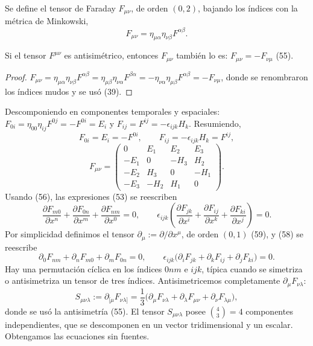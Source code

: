 \begin{definicion}
Se define el tensor de Faraday $F_{\mu\nu}$, de orden $(0,2)$, bajando
los índices con la métrica de Minkowski,
\[
F_{\mu\nu} = \eta_{\mu\alpha}\eta_{\nu\beta}F^{\alpha\beta}. \tag{54}
\]
\end{definicion}

\begin{proposicionc}
Si el tensor $F^{\mu\nu}$ es antisimétrico, entonces $F_{\mu\nu}$
también lo es: $F_{\mu\nu}=-F_{\nu\mu}$ (55).
\end{proposicionc}

\begin{proof}
$F_{\mu\nu}=\eta_{\mu\alpha}\eta_{\nu\beta}F^{\alpha\beta}=\eta_{\mu\beta}
\eta_{\nu\alpha}F^{\beta\alpha}=-\eta_{\nu\alpha}\eta_{\mu\beta}
F^{\alpha\beta}=-F_{\nu\mu}$, donde se renombraron los índices mudos y se
usó (39). \qedhere
\end{proof}

Descomponiendo en componentes temporales y espaciales:
$F_{0i}=\eta_{00}\eta_{ij}F^{0j}=-F^{0i}=E_i$ y
$F_{ij}=F^{ij}=-\epsilon_{ijk}H_k$. Resumiendo,
\[
F_{0i}=E_i=-F^{0i}, \qquad F_{ij}=-\epsilon_{ijk}H_k=F^{ij}, \tag{56}
\]
\[
F_{\mu\nu}=\begin{pmatrix}0&E_1&E_2&E_3\\-E_1&0&-H_3&H_2\\-E_2&H_3&0&-H_1
\\-E_3&-H_2&H_1&0\end{pmatrix}. \tag{57}
\]
Usando (56), las expresiones (53) se reescriben
\[
\frac{\partial F_{m0}}{\partial x^n}+\frac{\partial F_{0n}}{\partial
x^m}+\frac{\partial F_{nm}}{\partial x^0}=0, \qquad
\epsilon_{ijk}\left(\frac{\partial F_{jk}}{\partial x^i}+\frac{\partial
F_{ij}}{\partial x^k}+\frac{\partial F_{ki}}{\partial x^j}\right)=0.
\tag{58}
\]
Por simplicidad definimos el tensor $\partial_\mu:=\partial/\partial
x^\mu$, de orden $(0,1)$ (59), y (58) se reescribe
\[
\partial_0F_{nm}+\partial_nF_{m0}+\partial_mF_{0n}=0, \qquad
\epsilon_{ijk}\big(\partial_iF_{jk}+\partial_kF_{ij}+\partial_jF_{ki}
\big)=0. \tag{60}
\]
Hay una permutación cíclica en los índices $0nm$ e $ijk$, típica cuando
se simetriza o antisimetriza un tensor de tres índices. Antisimetricemos
completamente $\partial_\mu F_{\nu\lambda}$:
\[
S_{\mu\nu\lambda} := \partial_{[\mu}F_{\nu\lambda]} = \frac13\big(
\partial_\mu F_{\nu\lambda}+\partial_\lambda F_{\mu\nu}+\partial_\nu
F_{\lambda\mu}\big), \tag{61}
\]
donde se usó la antisimetría (55). El tensor $S_{\mu\nu\lambda}$ posee
$\binom43=4$ componentes independientes, que se descomponen en un vector
tridimensional y un escalar. Obtengamos las ecuaciones sin fuentes.

